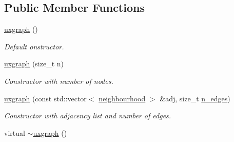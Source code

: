 \subsection*{Public Member Functions}
\begin{DoxyCompactItemize}
\item 
\hypertarget{classlgraph_1_1uxgraph_a9a57e95d157fa8de41f3e8caef155e46}{\hyperlink{classlgraph_1_1uxgraph_a9a57e95d157fa8de41f3e8caef155e46}{uxgraph} ()}\label{classlgraph_1_1uxgraph_a9a57e95d157fa8de41f3e8caef155e46}

\begin{DoxyCompactList}\small\item\em Default onstructor. \end{DoxyCompactList}\item 
\hypertarget{classlgraph_1_1uxgraph_a81f289cc52bad6d971390a39d3dae529}{\hyperlink{classlgraph_1_1uxgraph_a81f289cc52bad6d971390a39d3dae529}{uxgraph} (size\-\_\-t n)}\label{classlgraph_1_1uxgraph_a81f289cc52bad6d971390a39d3dae529}

\begin{DoxyCompactList}\small\item\em Constructor with number of nodes. \end{DoxyCompactList}\item 
\hyperlink{classlgraph_1_1uxgraph_a18a6a844ef0d8d719501216ef6c6bd76}{uxgraph} (const std\-::vector$<$ \hyperlink{namespacelgraph_a052e7766c13f3a43cec0aec8173fdede}{neighbourhood} $>$ \&adj, size\-\_\-t \hyperlink{classlgraph_1_1xxgraph_a8ca991d1521cb6ba77e1cd3494ab42be}{n\-\_\-edges})
\begin{DoxyCompactList}\small\item\em Constructor with adjacency list and number of edges. \end{DoxyCompactList}\item 
\hypertarget{classlgraph_1_1uxgraph_a8893aa833e787a7241654259f87dc767}{virtual \hyperlink{classlgraph_1_1uxgraph_a8893aa833e787a7241654259f87dc767}{$\sim$uxgraph} ()}\label{classlgraph_1_1uxgraph_a8893aa833e787a7241654259f87dc767}


\end{DoxyCompactItemize}
